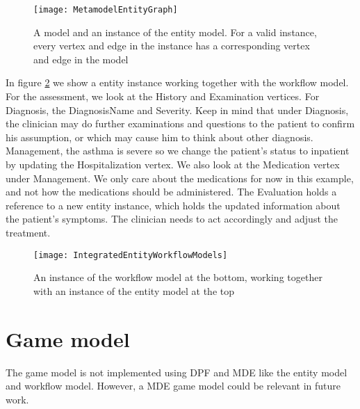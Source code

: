 \begin{figure}[h!]
	\texttt{[image: MetamodelEntityGraph]}
	\caption {A model and an instance of the entity model. For a valid instance, every vertex and edge in the instance has a corresponding vertex and edge in the model}
		\label{fig:MetamodelEntityGraph}
\end{figure}



In figure \ref{fig:IntegratedEntityWorkflowModels} we show a entity instance working together with the workflow model. For the assessment, we look at the History and Examination vertices. For Diagnosis, the DiagnosisName and Severity. Keep in mind that under Diagnosis, the clinician may do further examinations and questions to the patient to confirm his assumption, or which may cause him to think about other diagnosis. Management, the asthma is severe so we change the patient's status to inpatient by updating the Hospitalization vertex. We also look at the Medication vertex under Management. We only care about the medications for now in this example, and not how the medications should be administered. The Evaluation holds a reference to a new entity instance, which holds the updated information about the patient's symptoms. The clinician needs to act accordingly and adjust the treatment.

\begin{figure}[h!]
	\texttt{[image: IntegratedEntityWorkflowModels]}
		\caption {An instance of the workflow model at the bottom, working together with an instance of the entity model at the top}
		\label{fig:IntegratedEntityWorkflowModels}
\end{figure}


\section{Game model}
The game model is not implemented using DPF and MDE like the entity model and workflow model. However, a MDE game model could be relevant in future work.

